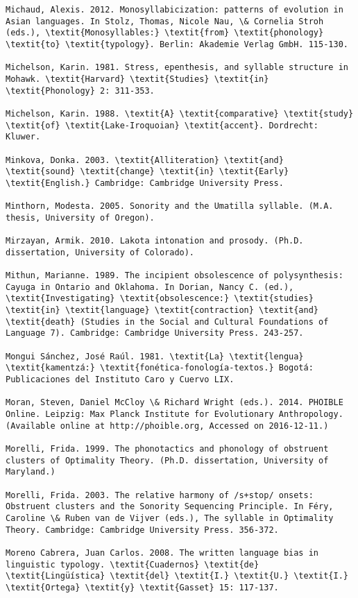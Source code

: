 \begin{verbatim}
Michaud, Alexis. 2012. Monosyllabicization: patterns of evolution in Asian languages. In Stolz, Thomas, Nicole Nau, \& Cornelia Stroh (eds.), \textit{Monosyllables:} \textit{from} \textit{phonology} \textit{to} \textit{typology}. Berlin: Akademie Verlag GmbH. 115-130.

Michelson, Karin. 1981. Stress, epenthesis, and syllable structure in Mohawk. \textit{Harvard} \textit{Studies} \textit{in} \textit{Phonology} 2: 311-353.

Michelson, Karin. 1988. \textit{A} \textit{comparative} \textit{study} \textit{of} \textit{Lake-Iroquoian} \textit{accent}. Dordrecht: Kluwer.

Minkova, Donka. 2003. \textit{Alliteration} \textit{and} \textit{sound} \textit{change} \textit{in} \textit{Early} \textit{English.} Cambridge: Cambridge University Press.

Minthorn, Modesta. 2005. Sonority and the Umatilla syllable. (M.A. thesis, University of Oregon).

Mirzayan, Armik. 2010. Lakota intonation and prosody. (Ph.D. dissertation, University of Colorado).

Mithun, Marianne. 1989. The incipient obsolescence of polysynthesis: Cayuga in Ontario and Oklahoma. In Dorian, Nancy C. (ed.), \textit{Investigating} \textit{obsolescence:} \textit{studies} \textit{in} \textit{language} \textit{contraction} \textit{and} \textit{death} (Studies in the Social and Cultural Foundations of Language 7). Cambridge: Cambridge University Press. 243-257.

Mongui Sánchez, José Raúl. 1981. \textit{La} \textit{lengua} \textit{kamentzá:} \textit{fonética-fonología-textos.} Bogotá: Publicaciones del Instituto Caro y Cuervo LIX.

Moran, Steven, Daniel McCloy \& Richard Wright (eds.). 2014. PHOIBLE Online. Leipzig: Max Planck Institute for Evolutionary Anthropology. (Available online at http://phoible.org, Accessed on 2016-12-11.)

Morelli, Frida. 1999. The phonotactics and phonology of obstruent clusters of Optimality Theory. (Ph.D. dissertation, University of Maryland.)

Morelli, Frida. 2003. The relative harmony of /s+stop/ onsets: Obstruent clusters and the Sonority Sequencing Principle. In Féry, Caroline \& Ruben van de Vijver (eds.), The syllable in Optimality Theory. Cambridge: Cambridge University Press. 356-372. 

Moreno Cabrera, Juan Carlos. 2008. The written language bias in linguistic typology. \textit{Cuadernos} \textit{de} \textit{Lingüística} \textit{del} \textit{I.} \textit{U.} \textit{I.} \textit{Ortega} \textit{y} \textit{Gasset} 15: 117-137.


\end{verbatim}

